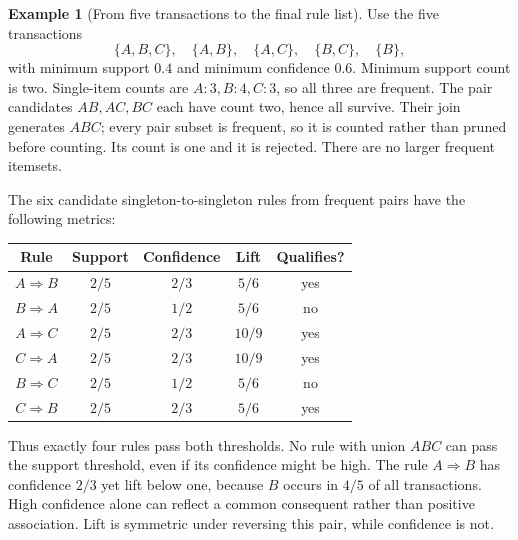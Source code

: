 \documentclass[11pt,twoside]{article}
\numberwithin{equation}{section}
\theoremstyle{plain}
\theoremstyle{definition}
\newtheorem{example}[theorem]{Example}
\theoremstyle{remark}
\begin{document}
\begin{example}[From five transactions to the final rule list]
Use the five transactions
\[
\{A,B,C\},\quad\{A,B\},\quad\{A,C\},\quad\{B,C\},\quad\{B\},
\]
with minimum support $0.4$ and minimum confidence $0.6$. Minimum support count is two. Single-item counts are $A:3,B:4,C:3$, so all three are frequent. The pair candidates $AB,AC,BC$ each have count two, hence all survive. Their join generates $ABC$; every pair subset is frequent, so it is counted rather than pruned before counting. Its count is one and it is rejected. There are no larger frequent itemsets.

The six candidate singleton-to-singleton rules from frequent pairs have the following metrics:
\begin{center}
\begin{tabular}{c|ccc|c}
Rule & Support & Confidence & Lift & Qualifies?\\\hline
$A\Rightarrow B$&$2/5$&$2/3$&$5/6$&yes\\
$B\Rightarrow A$&$2/5$&$1/2$&$5/6$&no\\
$A\Rightarrow C$&$2/5$&$2/3$&$10/9$&yes\\
$C\Rightarrow A$&$2/5$&$2/3$&$10/9$&yes\\
$B\Rightarrow C$&$2/5$&$1/2$&$5/6$&no\\
$C\Rightarrow B$&$2/5$&$2/3$&$5/6$&yes
\end{tabular}
\end{center}
Thus exactly four rules pass both thresholds. No rule with union $ABC$ can pass the support threshold, even if its confidence might be high. The rule $A\Rightarrow B$ has confidence $2/3$ yet lift below one, because $B$ occurs in $4/5$ of all transactions. High confidence alone can reflect a common consequent rather than positive association. Lift is symmetric under reversing this pair, while confidence is not.
\end{example}
\end{document}
